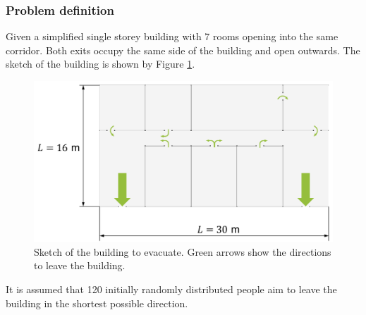 \documentclass[a4paper,12pt,openany]{book}
\theoremstyle{break}
\begin{document}
\subsubsection{Problem definition}
Given a simplified single storey building with 7 rooms opening into the same corridor. Both exits occupy the same side of the building and open outwards. The sketch of the building is shown by Figure \ref{fig:building_sketch}.
\begin{figure}[H]
  \includegraphics[scale=0.5]{building_sketch.pdf}
  \centering
  \caption{Sketch of the building to evacuate. Green arrows show the directions to leave the building.}
  \label{fig:building_sketch}
\end{figure}\vspace*{3pt}
It is assumed that 120 initially randomly distributed people aim to leave the building in the shortest possible direction.
\end{document}
